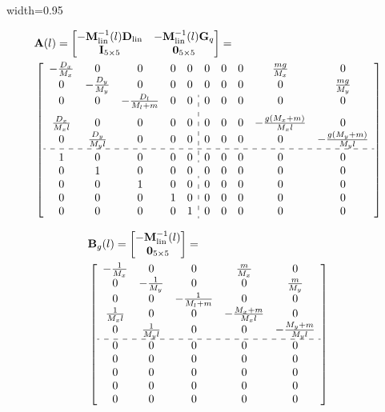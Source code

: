 \documentclass{ppgeesa}
\begin{document}
\begin{adjustbox}{width=0.95\linewidth}
  \parbox{\linewidth}{
\begin{align}
&\mathbf{A}(l) = \begin{bmatrix} -\mathbf{M}_{\text{lin}}^{-1}(l)\mathbf{D}_{\text{lin}} & -\mathbf{M}_{\text{lin}}^{-1}(l)\mathbf{G}_q \\ \mathbf{I}_{5\times5} & \mathbf{0}_{5\times5} \end{bmatrix} = \nonumber\\
&\left[\begin{array}{ccccc:ccccc}
-\frac{D_x}{M_x} & 0 & 0 & 0 & 0 & 0 & 0 & 0 & \frac{mg}{M_x} & 0 \\
0 & -\frac{D_y}{M_y} & 0 & 0 & 0 & 0 & 0 & 0 & 0 & \frac{mg}{M_y} \\
0 & 0 & -\frac{D_l}{M_l + m} & 0 & 0 & 0 & 0 & 0 & 0 & 0 \\[6pt]
\frac{D_x}{M_x l} & 0 & 0 & 0 & 0 & 0 & 0 & 0 & -\frac{g(M_x + m)}{M_x l} & 0 \\
0 & \frac{D_y}{M_y l} & 0 & 0 & 0 & 0 & 0 & 0 & 0 & -\frac{g(M_y + m)}{M_y l} \\
\hdashline\\[-10pt]
1 & 0 & 0 & 0 & 0 & 0 & 0 & 0 & 0 & 0 \\
0 & 1 & 0 & 0 & 0 & 0 & 0 & 0 & 0 & 0 \\
0 & 0 & 1 & 0 & 0 & 0 & 0 & 0 & 0 & 0 \\
0 & 0 & 0 & 1 & 0 & 0 & 0 & 0 & 0 & 0 \\
0 & 0 & 0 & 0 & 1 & 0 & 0 & 0 & 0 & 0 
\end{array}\right]
\end{align}
}
\end{adjustbox}

\begin{align}
&\mathbf{B}_g(l) = \begin{bmatrix} -\mathbf{M}_{\text{lin}}^{-1}(l) \\ \mathbf{0}_{5\times5} \end{bmatrix} = \nonumber\\
&\left[\begin{array}{ccccc}
-\frac{1}{M_x} & 0 & 0 & \frac{m}{M_x} & 0 \\
0 & -\frac{1}{M_y} & 0 & 0 & \frac{m}{M_y} \\
0 & 0 & -\frac{1}{M_l + m} & 0 & 0 \\
\frac{1}{M_x l} & 0 & 0 & -\frac{M_x + m}{M_x l} & 0 \\
0 & \frac{1}{M_y l} & 0 & 0 & -\frac{M_y + m}{M_y l} \\
\hdashline
0 & 0 & 0 & 0 & 0 \\
0 & 0 & 0 & 0 & 0 \\
0 & 0 & 0 & 0 & 0 \\
0 & 0 & 0 & 0 & 0 \\
0 & 0 & 0 & 0 & 0
\end{array}\right]
\end{align}
\end{document}
